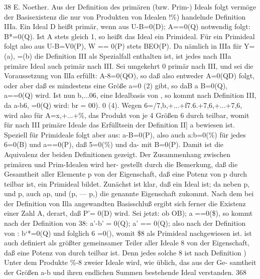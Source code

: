 \documentclass[11pt,a4paper]{article}
\theoremstyle{plain}
\theoremstyle{definition}
\begin{document}
38 
E. Noether. 
Aus der Definition 
des primären (bzw. Prim-) Ideals 
folgt vermöge 
der Basisexistenz die nur von Produkten von Idealen !\%) handelnde 
Definition IIIa. Ein Ideal D heißt primär, wenn aus U-B=0(D); 
A==0(Q) notwendig folgt: 
B*=0(Q). 
Ist A stets gleich 1, so heißt 
das Ideal ein Primideal. 
Für ein Primideal  folgt also aus U-B=V0(P), 
W == 0(P) stets 
BEO(P). 
Da nämlich 
in IIIa 
fiir Y=(a), =(b) die Definition III als 
Spezialfall enthalten ist, ist jedes nach IIIa primäre Ideal auch primär 
nach III. 
Sei umgekehrt 0 primär nach III, und sei die Voraussetzung 
von IlIa erfüllt: A-8=0(QO), 
so daß also entweder A=0(QD) folgt, 
oder aber daß es mindestens eine Größe a=0 (2) gibt, so daB a B=0(Q), 
a==0(Q) wird. 
Ist nun b,...06, eine Idealbasis von , so kommt nach 
Definition III, da a-b6, 
=0(Q) wird: 
br = 00). 
0 (4). 
Wegen 
6=/7,b,+...+f7.6.+7,6,+...+7,6, 
wird 
also 
für 
A=x,+...+\%, das Produkt von je 4 Größen 6 durch  teilbar, womit 
für nach III primäre Ideale das Erfülltsein der Definition II] a bewiesen 
ist. 
Speziell für Primideale  folgt aber aus: a-B=0(P), 
also auch 
a:b=0(\%) für jedes 6=0(B) und a==0(P), daß 5=0(\%) und da- 
mit 
B=0(P). 
Damit ist die Aquivalenz der beiden Definitionen gezeigt. 
Der Zusammenhang zwischen 
primären und Prim-Idealen wird her- 
gestellt durch die Bemerkung, 
daß die Gesamtheit  aller Elemente p 
von 
der Eigenschaft, 
daß eine Potenz von p durch  teilbar ist, ein 
Primideal 
bildet. 
Zunächst ist klar, daß  ein Ideal ist; da neben p, 
und p, auch ap, und (p, --- p,) die genannte Eigenschaft zukommt. 
Nach 
dem bei der Definition von Illa angewandten Basisschluß 
ergibt sich 
ferner die Existenz einer Zahl A, derart, daß P'= 0(D) wird. 
Sei jetzt: 
ob 
OB); 
a ==0(\$), 
so kommt nach der Definition von 38: 
a'-b' = 0(Q); 
a' == 0(Q); 
also nach der Definition von : 
b`*=0(Q) 
und folglich 
6 =0(), 
womit \$8 als Primideal nachgewiesen ist.  ist auch definiert als größter 
gemeinsamer Teiler aller Ideale 8 von der Eigenschaft, daß eine Potenz 
von  durch  teilbar ist. 
Denn jedes solche 8 ist nach Definition 
) Unter dem Produkte \%-8 zweier Ideale wird, wie üblich, das aus der Ge- 
samtheit der Größen a-b und ihren endlichen Summen bestehende Ideal verstanden. 
368
\end{document}
